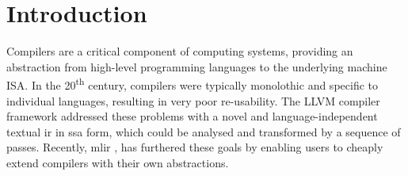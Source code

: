 \chapter{Introduction}
\label{chap:introduction}






Compilers are a critical component of computing systems, providing an abstraction %
from high-level programming languages to the underlying machine ISA.
In the 20\textsuperscript{th} century, compilers were typically monolothic and specific to individual languages, resulting in very poor re-usability.
The LLVM compiler framework \cite{lattnerLLVMCompilationFramework2004} addressed these problems with a novel and language-independent textual \ac{ir} in \ac{ssa} form, which could be analysed and transformed by a sequence of passes.
Recently, \ac{mlir} \cite{lattnerMLIRScalingCompiler2021a}, has furthered these goals by enabling users to cheaply extend compilers with their own abstractions. %





